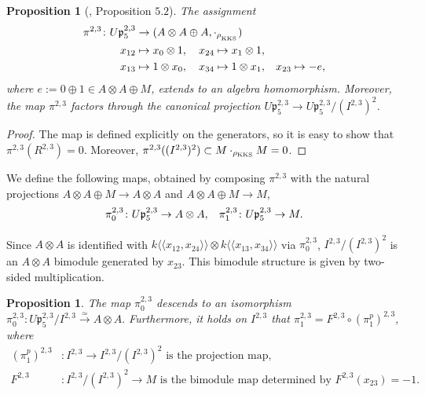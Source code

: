 \documentclass[a4paper,fleqn]{cas-sc}
\newtheorem{proposition}[theorem]{Proposition}
\begin{document}
\begin{proposition}[\cite{ANR}, Proposition $5.2$] \label{prop:pi-2-3}
	The assignment
	\begin{align*}
		\pi^{2,3} \colon U\mathfrak{p}^{2,3}_5 &\to (A \otimes A \oplus A, \cdot_{\rho_{\rm_{KKS}}}) \\
		x_{12} &\mapsto x_0 \otimes 1, \quad x_{24}\mapsto x_1\otimes 1,  \\
		x_{13} &\mapsto 1 \otimes x_0,\quad x_{34}\mapsto 1\otimes x_1,\hskip 0.3cm x_{23} \mapsto -e,
	\end{align*}
	where $e := 0 \oplus 1 \in A \otimes A \oplus M$, extends to an algebra homomorphism. Moreover, the map $\pi^{2,3}$ factors through the canonical projection $U\mathfrak{p}^{2,3}_{5} \to U\mathfrak{p}^{2,3}_5/(I^{2,3})^2$.
\end{proposition}

\begin{proof}
The map is defined explicitly on the generators, so it is easy to show that $\pi^{2,3}(R^{2,3})=0$. Moreover, $\pi^{2,3}((I^{2,3})^2)\subset M\cdot_{\rho_{\rm{KKS}}}M=0$.
\end{proof}

We define the following maps, obtained by composing $\pi^{2,3}$ with the natural projections 
$A \otimes A \oplus M \to A \otimes A$ and $A \otimes A \oplus M \to  M$, 
%
$$
\pi^{2,3}_0 \colon U\mathfrak{p}^{2,3}_5 \to A \otimes A, \hskip 0.3cm
\pi^{2,3}_1 \colon U\mathfrak{p}^{2,3}_5 \to M.
$$	

Since $A\otimes A$ is identified with $k\langle\langle x_{12},x_{24}\rangle\rangle\otimes k\langle\langle x_{13},x_{34}\rangle\rangle$ via $\pi_0^{2,3}$, $I^{2,3}/(I^{2,3})^2$ is an $A\otimes A$ bimodule generated by $x_{23}$. This bimodule structure is given by two-sided multiplication.

\begin{proposition}%
\label{prop:projection}
The map $\pi^{2,3}_0$ descends to an isomorphism 
$
        \pi^{2,3}_0:U\mathfrak{p}^{2,3}_5/I^{2,3} \overset{\simeq}{\longrightarrow} A\otimes A.
$
Furthermore, it holds on $I^{2,3}$ that $\pi^{2,3}_1=F^{2,3}\circ (\pi_1^p)^{2,3}$, where
    \begin{equation*}
        \begin{split}
            (\pi_1^p)^{2,3} & :I^{2,3}\to I^{2,3}/(I^{2,3})^2 \text{ is the projection map}, \\
            F^{2,3} & :I^{2,3}/(I^{2,3})^2 \to M \text{ is the bimodule map determined by } F^{2,3}(x_{23})=-1.
        \end{split}
    \end{equation*}
\end{proposition}
\end{document}
